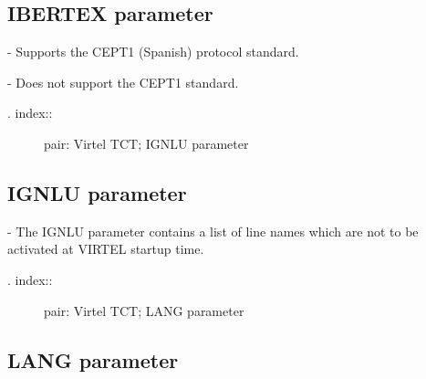 \documentclass[letterpaper,10pt,english]{sphinxmanual}
\begin{document}
\subsection{IBERTEX parameter}
\label{\detokenize{Installation_Guide:ibertex-parameter}}
\begin{sphinxVerbatim}[commandchars=\\\{\}]
                      
\end{sphinxVerbatim}

 - Supports the CEPT1 (Spanish) protocol standard.

 - Does not support the CEPT1 standard.
\begin{description}
\item[{. index::}] \leavevmode
pair: Virtel TCT; IGNLU parameter

\end{description}


\subsection{IGNLU parameter}
\label{\detokenize{Installation_Guide:ignlu-parameter}}
\begin{sphinxVerbatim}[commandchars=\\\{\}]
            
\end{sphinxVerbatim}

 - The IGNLU parameter contains a list of line names which are not to be activated at VIRTEL startup time.
\begin{description}
\item[{. index::}] \leavevmode
pair: Virtel TCT; LANG parameter

\end{description}


\subsection{LANG parameter}
\label{\detokenize{Installation_Guide:lang-parameter}}
\begin{sphinxVerbatim}[commandchars=\\\{\}]
                             
\end{sphinxVerbatim}
\end{document}
